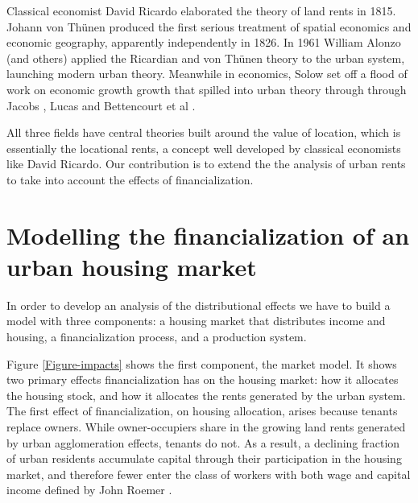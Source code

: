Classical economist David Ricardo \cite{ricardoEssayInfluenceLow1815} elaborated the theory of land rents in 1815. Johann von Th\"unen \cite{vonthunenIsolirteStaatBeziehung1826} %
produced the first serious treatment of spatial economics and economic geography, apparently independently in 1826. In 1961 William Alonzo (and others) \cite{alonsoModelUrbanLand1960} applied the  Ricardian and von Th\"unen theory to the urban system, launching modern urban theory. Meanwhile in economics, Solow \cite{solowContributionTheoryEconomic1956} set off a flood of work on  economic growth growth that  spilled into urban theory through through Jacobs \cite{jacobsEconomyCities1969}, Lucas \cite{lucasMechanicsEconomicDevelopment1988} and Bettencourt et al \cite{bettencourtGrowthInnovationScaling2007}. 

All three fields have central theories built around %
the value of location, which is essentially the %
locational rents, a concept well developed by classical economists like David Ricardo. Our contribution is to extend the the analysis of urban rents to take into account the effects of financialization.


\section{Modelling the financialization of an urban housing market}
In order to develop an analysis of the distributional effects we have to build a model with three components: a housing market that distributes income and housing, a financialization process, and a production system. 

Figure \ref{Figure-impacts} shows the first component, the market model.
It shows two primary effects financialization has on the housing market: how it allocates %
the housing stock, and how it allocates the \glspl{rent} generated by the urban system. %
The first effect of financialization, on housing allocation, arises because tenants replace owners. While owner-occupiers share in the growing land rents generated by urban agglomeration effects, tenants do not. As a result, a declining fraction of urban residents accumulate capital through their participation in the housing market, and therefore fewer enter the class of workers with both wage and capital income defined by John Roemer \cite{roemerGeneralTheoryExploitation1982}. 

